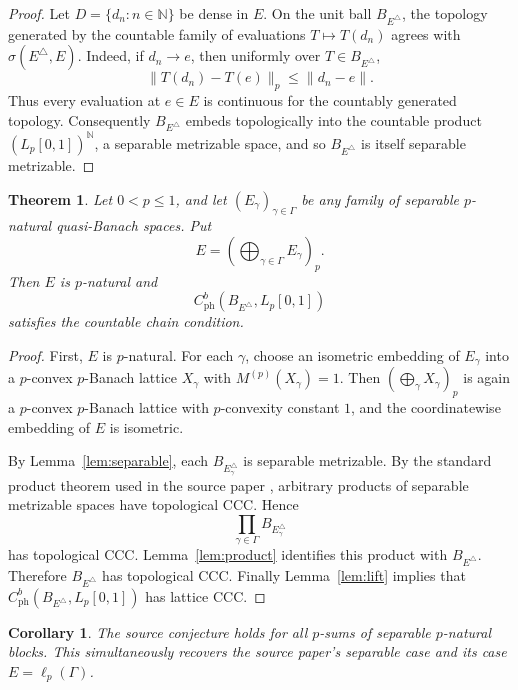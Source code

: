 \documentclass[11pt]{article}
\newtheorem{theorem}{Theorem}
\newtheorem{corollary}{Corollary}
\newcommand{\Lp}{L_p[0,1]}
\newcommand{\ph}{\mathrm{ph}}
\begin{document}
\begin{proof}
Let \(D=\{d_n:n\in\mathbb N\}\) be dense in \(E\).  On the unit ball
\(B_{E^\triangle}\), the topology generated by the countable family of
evaluations \(T\mapsto T(d_n)\) agrees with \(\sigma(E^\triangle,E)\).  Indeed,
if \(d_n\to e\), then uniformly over \(T\in B_{E^\triangle}\),
\[
  \|T(d_n)-T(e)\|_p\leq \|d_n-e\|.
\]
Thus every evaluation at \(e\in E\) is continuous for the countably generated
topology.  Consequently \(B_{E^\triangle}\) embeds topologically into the
countable product \((\Lp)^{\mathbb N}\), a separable metrizable space, and so
\(B_{E^\triangle}\) is itself separable metrizable.
\end{proof}

\begin{theorem}
\label{thm:main}
Let \(0<p\leq1\), and let \((E_\gamma)_{\gamma\in\Gamma}\) be any family of
separable \(p\)-natural quasi-Banach spaces.  Put
\[
  E=\left(\bigoplus_{\gamma\in\Gamma}E_\gamma\right)_p .
\]
Then \(E\) is \(p\)-natural and
\[
  C_{\ph}^b(B_{E^\triangle},\Lp)
\]
satisfies the countable chain condition.
\end{theorem}

\begin{proof}
First, \(E\) is \(p\)-natural.  For each \(\gamma\), choose an isometric
embedding of \(E_\gamma\) into a \(p\)-convex \(p\)-Banach lattice \(X_\gamma\)
with \(M^{(p)}(X_\gamma)=1\).  Then
\((\bigoplus_\gamma X_\gamma)_p\) is again a \(p\)-convex \(p\)-Banach lattice
with \(p\)-convexity constant \(1\), and the coordinatewise embedding of \(E\)
is isometric.

By Lemma~\ref{lem:separable}, each \(B_{E_\gamma^\triangle}\) is separable
metrizable.  By the standard product theorem used in the source paper
\cite[2.7.10(d)]{engelking}, arbitrary products of separable metrizable spaces
have topological CCC.  Hence
\[
  \prod_{\gamma\in\Gamma}B_{E_\gamma^\triangle}
\]
has topological CCC.  Lemma~\ref{lem:product} identifies this product with
\(B_{E^\triangle}\).  Therefore \(B_{E^\triangle}\) has topological CCC.
Finally Lemma~\ref{lem:lift} implies that
\(C_{\ph}^b(B_{E^\triangle},\Lp)\) has lattice CCC.
\end{proof}

\begin{corollary}
The source conjecture holds for all \(p\)-sums of separable \(p\)-natural
blocks.  This simultaneously recovers the source paper's separable case and
its case \(E=\ell_p(\Gamma)\).
\end{corollary}
\end{document}
